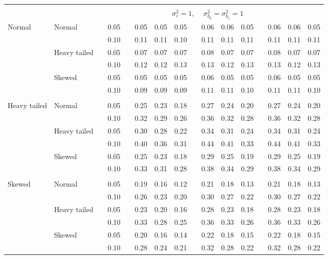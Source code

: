 \documentclass{article} %
\begin{document}
\begin{table}[ht]
\begin{scriptsize}
\begin{center}
\begin{tabular}{ll p{.1cm} c p{.1cm} rrr p{.1cm} rrr p{.1cm} rrr}
&&&&&&&&&&&&&&&\\
& && && \multicolumn{9}{c}{$\sigma_{\varepsilon}^2 = 1$, \ \ $\sigma_{b_0}^2 = \sigma_{b_1}^2 = 1$} \\ \cline{6-16}
\rowcolor{gray!20}Normal       & Normal       && 0.05 &&   0.05 & 0.05 & 0.05 && 0.06 & 0.06 & 0.05 && 0.06 & 0.06 & 0.05 \\ 
\rowcolor{gray!20}             &              && 0.10 &&   0.11 & 0.11 & 0.10 && 0.11 & 0.11 & 0.11 && 0.11 & 0.11 & 0.11 \\ 
\rowcolor{gray!20}             & Heavy tailed && 0.05 &&   0.07 & 0.07 & 0.07 && 0.08 & 0.07 & 0.07 && 0.08 & 0.07 & 0.07 \\ 
\rowcolor{gray!20}             &              && 0.10 &&   0.12 & 0.12 & 0.13 && 0.13 & 0.12 & 0.13 && 0.13 & 0.12 & 0.13 \\ 
\rowcolor{gray!20}             & Skewed       && 0.05 &&   0.05 & 0.05 & 0.05 && 0.06 & 0.05 & 0.05 && 0.06 & 0.05 & 0.05 \\ 
\rowcolor{gray!20}             &              && 0.10 &&   0.09 & 0.09 & 0.09 && 0.11 & 0.11 & 0.10 && 0.11 & 0.11 & 0.10 \\ 
             &&&&&&&&&&&&&&&\\
Heavy tailed & Normal       && 0.05 &&   0.25 & 0.23 & 0.18 && 0.27 & 0.24 & 0.20 && 0.27 & 0.24 & 0.20 \\ 
             &              && 0.10 &&   0.32 & 0.29 & 0.26 && 0.36 & 0.32 & 0.28 && 0.36 & 0.32 & 0.28 \\ 
             & Heavy tailed && 0.05 &&   0.30 & 0.28 & 0.22 && 0.34 & 0.31 & 0.24 && 0.34 & 0.31 & 0.24 \\ 
             &              && 0.10 &&   0.40 & 0.36 & 0.31 && 0.44 & 0.41 & 0.33 && 0.44 & 0.41 & 0.33 \\ 
             & Skewed       && 0.05 &&   0.25 & 0.23 & 0.18 && 0.29 & 0.25 & 0.19 && 0.29 & 0.25 & 0.19 \\ 
             &              && 0.10 &&   0.33 & 0.31 & 0.28 && 0.38 & 0.34 & 0.29 && 0.38 & 0.34 & 0.29 \\ 
             &&&&&&&&&&&&&&&\\
Skewed       & Normal       && 0.05 &&   0.19 & 0.16 & 0.12 && 0.21 & 0.18 & 0.13 && 0.21 & 0.18 & 0.13 \\ 
             &              && 0.10 &&   0.26 & 0.23 & 0.20 && 0.30 & 0.27 & 0.22 && 0.30 & 0.27 & 0.22 \\ 
             & Heavy tailed && 0.05 &&   0.23 & 0.20 & 0.16 && 0.28 & 0.23 & 0.18 && 0.28 & 0.23 & 0.18 \\ 
             &              && 0.10 &&   0.33 & 0.28 & 0.25 && 0.36 & 0.33 & 0.26 && 0.36 & 0.33 & 0.26 \\ 
             & Skewed       && 0.05 &&   0.20 & 0.16 & 0.14 && 0.22 & 0.18 & 0.15 && 0.22 & 0.18 & 0.15 \\ 
             &              && 0.10 &&   0.28 & 0.24 & 0.21 && 0.32 & 0.28 & 0.22 && 0.32 & 0.28 & 0.22 \\ 



\end{tabular}
\end{center}
\end{scriptsize}
\end{table}
\end{document}
